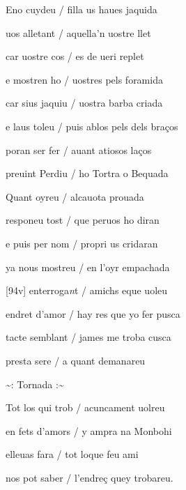 \documentclass[12pt]{article}
\begin{document}
\begin{estrofa}

 Eno cuydeu / filla us haues jaquida

 uos alletant / aquella'n uostre llet

 car uostre cos / es de ueri replet

 e mostren ho / uostres pels foramida

 car sius jaquiu / uostra barba criada

 e laus toleu / puis ablos pels dels bra\c{c}os

 poran ser fer / auant atiosos la\c{c}os

 preuint Perdiu / ho Tortra o Bequada

\end{estrofa}



\begin{estrofa}

 Quant oyreu / alcauota prouada

 responeu tost / que peruos ho diran

 e puis per nom / propri us cridaran

 ya nous mostreu / en l'oyr empachada

 [94v] enterroga\textit{n}t / amichs eque uoleu

 endret d'amor / hay res que yo fer pusca

 tacte semblant / james me troba cusca

 presta sere / a quant demanareu

\end{estrofa}


\begin{estrofaExtra}%




\begin{tornada}

\textasciitilde{}: Tornada :\textasciitilde{}

\end{tornada}


\end{estrofaExtra}


\begin{estrofa}

 Tot los qui trob / acuncament uolreu

 en fets d'amors / y ampra na Monbohi

 elleuas fara / tot loque feu ami

 nos pot saber / l'endre\c{c} quey trobareu.

\end{estrofa}
\end{document}
